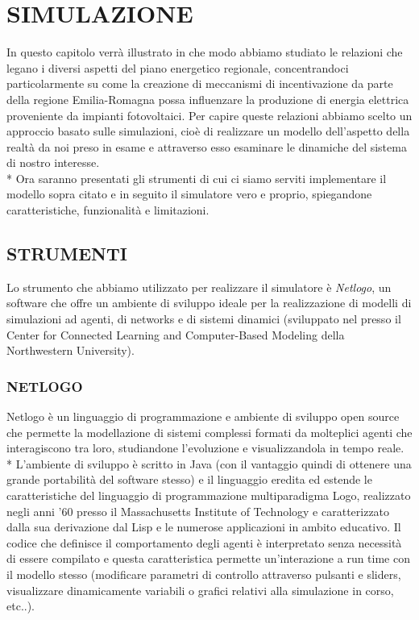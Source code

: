 \documentclass[12pt,a4paper,openright,twoside]{report}
\begin{document}
\chapter{SIMULAZIONE}

In questo capitolo verrà illustrato in che modo abbiamo studiato le relazioni che legano i diversi aspetti del piano energetico regionale, concentrandoci particolarmente su come la creazione di meccanismi di incentivazione da parte della regione Emilia-Romagna possa influenzare la produzione di energia elettrica proveniente da impianti fotovoltaici.
Per capire queste relazioni abbiamo scelto un approccio basato sulle simulazioni, cioè di realizzare un modello dell'aspetto della realtà da noi preso in esame e attraverso esso esaminare le dinamiche del sistema di nostro interesse.
\\*
Ora saranno presentati gli strumenti di cui ci siamo serviti implementare il modello sopra citato e in seguito il simulatore vero e proprio, spiegandone caratteristiche, funzionalità e limitazioni.

\section{STRUMENTI}

Lo strumento che abbiamo utilizzato per realizzare il simulatore  è \emph{Netlogo}, un software che offre un ambiente di sviluppo ideale per la realizzazione di modelli di simulazioni ad agenti, di networks e di sistemi dinamici (sviluppato nel presso il Center for Connected Learning and Computer-Based Modeling della Northwestern University).


\subsection{NETLOGO}

Netlogo è un linguaggio di programmazione e ambiente di sviluppo open source che permette la modellazione di sistemi complessi formati da molteplici agenti che interagiscono tra loro, studiandone l'evoluzione  e visualizzandola in tempo reale.
\\* L'ambiente di sviluppo è scritto in Java (con il vantaggio quindi di ottenere una grande portabilità del software stesso) e il linguaggio eredita ed estende le caratteristiche del linguaggio di programmazione multiparadigma Logo, realizzato negli anni '60 presso il Massachusetts Institute of Technology e caratterizzato dalla sua derivazione dal Lisp e le numerose applicazioni in ambito educativo. Il codice che definisce il comportamento degli agenti è interpretato senza necessità di essere compilato e questa caratteristica permette un'interazione a run time con il modello stesso (modificare parametri di controllo attraverso pulsanti e sliders, visualizzare dinamicamente variabili o grafici relativi alla simulazione in corso, etc..).
\end{document}
